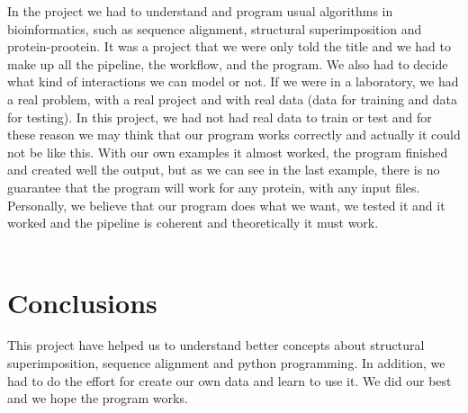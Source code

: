 \documentclass[a4paper,10pt]{report}
\begin{document}
In the project we had to understand and program usual algorithms in bioinformatics, such as sequence alignment, structural superimposition and protein-prootein. It was a project that we were only told the title and we had to make up all the pipeline, the workflow, and the program. We also had to decide what kind of interactions we can model or not.
If we were in a laboratory, we had a real problem, with a real project and with real data (data for training and data for testing). In this project, we had not had real data to train or test and for these reason we may think that our program works correctly and actually it could not be like this. With our own examples it almost worked, the program finished and created well the output, but as we can see in the last example, there is no guarantee that the program will work for any protein, with any input files. Personally, we believe that our program does what we want, we tested it and it worked and the pipeline is coherent and theoretically it must work.\\\\

\chapter{Conclusions}

This project have helped us to understand better concepts about structural superimposition, sequence alignment and python programming. In addition, we had to do the effort for create our own data and learn to use it. We did our best and we hope the program works.
\end{document}
